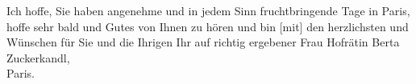 \pstart
           Ich hoffe, Sie haben angenehme und in jedem Sinn fruchtbringende Tage in Paris, hoffe sehr bald und Gutes von Ihnen zu
               hören und bin {[}mit{]} den herzlichsten \label{T_L03963-2v}\label{T_L03963-2} und Wünschen für Sie
               und die Ihrigen\pend
           \pstart Ihr auf richtig ergebener\pend{}{\vspace{1\baselineskip}}
\pstart
           \noindent{}Frau Hofrätin Berta Zuckerkandl,{\\}Paris.\pend
           \endnumbering{}
\begin{anhang}
\end{anhang}\newcommand{\dateiname}{L03963}\newcommand{\titel}{Arthur Schnitzler an Berta Zuckerkandl, 2. 1. 1926}\newcommand{\editorInnen}{Herausgegeben von Jahnke, SelmaMüller, Martin Anton}
